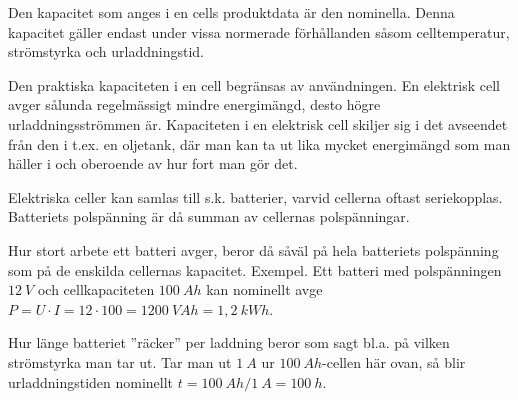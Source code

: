 Den kapacitet som anges i en cells produktdata är den nominella. Denna kapacitet
gäller endast under vissa normerade förhållanden såsom celltemperatur,
strömstyrka och urladdningstid.

Den praktiska kapaciteten i en cell begränsas av användningen. En elektrisk cell
avger sålunda regelmässigt mindre energimängd, desto högre urladdningsströmmen
är. Kapaciteten i en elektrisk cell skiljer sig i det avseendet från den i
t.ex. en oljetank, där man kan ta ut lika mycket energimängd som man häller i
och oberoende av hur fort man gör det.

Elektriska celler kan samlas till s.k. batterier, varvid cellerna oftast
seriekopplas.
Batteriets polspänning är då summan av cellernas polspänningar.

Hur stort arbete ett batteri avger, beror då såväl på hela batteriets
polspänning som på de enskilda cellernas kapacitet.
Exempel.
Ett batteri med polspänningen \(12\ V\) och cellkapaciteten \(100\ Ah\) kan
nominellt avge
\(P = U \cdot I = 12 \cdot 100 = 1200\ VAh = 1,2\ kWh\).

Hur länge batteriet ''räcker'' per laddning beror som sagt bl.a. på vilken
strömstyrka man tar ut. Tar man ut \(1\ A\) ur \(100\ Ah\)-cellen här ovan, så
blir urladdningstiden nominellt \(t = 100\ Ah/1\ A = 100\ h\).
